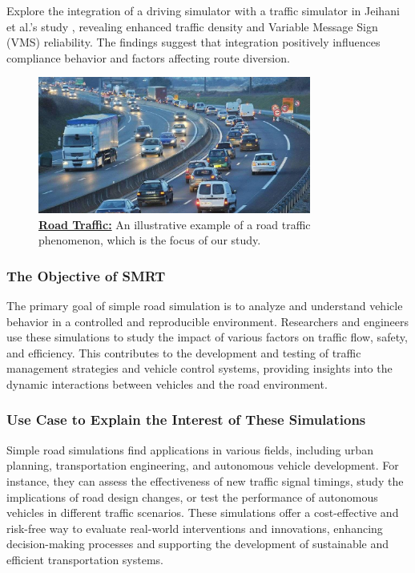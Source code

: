 \documentclass{article}
\begin{document}
		Explore the integration of a driving simulator with a traffic simulator in Jeihani et al.'s study \cite{JEIHANI2017164}, revealing enhanced traffic density and Variable Message Sign (VMS) reliability. The findings suggest that integration positively influences compliance behavior and factors affecting route diversion.
		
		
		\begin{figure}[H]
			\centering
			\includegraphics[width=0.8\textwidth]{intro.jpg}
			\caption{\textbf{\underline{Road Traffic:}} An illustrative example of a road traffic phenomenon, which is the focus of our study.}
			\label{fig:intro}
		\end{figure}
	
		
		\subsubsection{The Objective of SMRT}
		The primary goal of simple road simulation is to analyze and understand vehicle behavior in a controlled and reproducible environment. Researchers and engineers use these simulations to study the impact of various factors on traffic flow, safety, and efficiency. This contributes to the development and testing of traffic management strategies and vehicle control systems, providing insights into the dynamic interactions between vehicles and the road environment.
		
		\subsubsection{Use Case to Explain the Interest of These Simulations}
		Simple road simulations find applications in various fields, including urban planning, transportation engineering, and autonomous vehicle development. For instance, they can assess the effectiveness of new traffic signal timings, study the implications of road design changes, or test the performance of autonomous vehicles in different traffic scenarios. These simulations offer a cost-effective and risk-free way to evaluate real-world interventions and innovations, enhancing decision-making processes and supporting the development of sustainable and efficient transportation systems.
		
\end{document}

